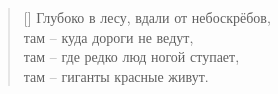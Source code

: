 \documentclass[a5paper,11pt]{memoir}
\begin{document}
\newpage
\hfill
{}
\BgThispage
\clearpage


\PlainPoemTitle
{}
\settowidth{\versewidth}{Глубоко в лесу, вдали от небоскрёбов}
\label{poem:red-giants.ru}
\begin{verse}[\versewidth]
	\hspace{-3cm}Глубоко в лесу, вдали от небоскрёбов,\\
	\hspace{-3cm}там -- куда дороги не ведут,\\
	\hspace{-3cm}там -- где редко люд ногой ступает,\\
	\hspace{-3cm}там -- гиганты красные живут.
\end{verse}
\end{document}
